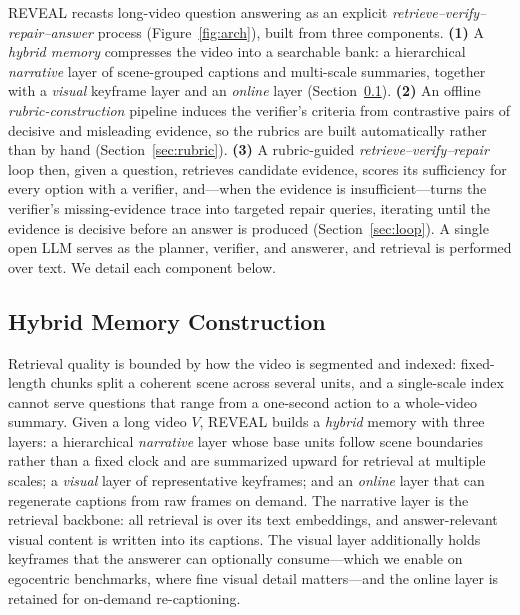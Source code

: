 \documentclass[letterpaper]{article} %
\begin{document}
REVEAL recasts long-video question answering as an explicit \emph{retrieve--verify--repair--answer} process (Figure~\ref{fig:arch}), built from three components. \textbf{(1)} A \emph{hybrid memory} compresses the video into a searchable bank: a hierarchical \emph{narrative} layer of scene-grouped captions and multi-scale summaries, together with a \emph{visual} keyframe layer and an \emph{online} layer (Section~\ref{sec:memory}). \textbf{(2)} An offline \emph{rubric-construction} pipeline induces the verifier's criteria from contrastive pairs of decisive and misleading evidence, so the rubrics are built automatically rather than by hand (Section~\ref{sec:rubric}). \textbf{(3)} A rubric-guided \emph{retrieve--verify--repair} loop then, given a question, retrieves candidate evidence, scores its sufficiency for every option with a verifier, and---when the evidence is insufficient---turns the verifier's missing-evidence trace into targeted repair queries, iterating until the evidence is decisive before an answer is produced (Section~\ref{sec:loop}). A single open LLM serves as the planner, verifier, and answerer, and retrieval is performed over text. We detail each component below.

\subsection{Hybrid Memory Construction}
\label{sec:memory}

Retrieval quality is bounded by how the video is segmented and indexed: fixed-length chunks split a coherent scene across several units, and a single-scale index cannot serve questions that range from a one-second action to a whole-video summary. Given a long video $V$, REVEAL builds a \emph{hybrid} memory with three layers: a hierarchical \emph{narrative} layer whose base units follow scene boundaries rather than a fixed clock and are summarized upward for retrieval at multiple scales; a \emph{visual} layer of representative keyframes; and an \emph{online} layer that can regenerate captions from raw frames on demand. The narrative layer is the retrieval backbone: all retrieval is over its text embeddings, and answer-relevant visual content is written into its captions. The visual layer additionally holds keyframes that the answerer can optionally consume---which we enable on egocentric benchmarks, where fine visual detail matters---and the online layer is retained for on-demand re-captioning.
\end{document}
